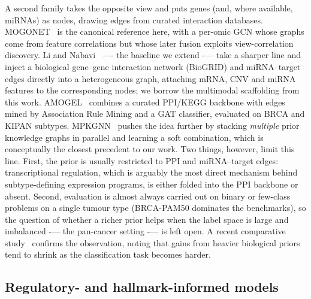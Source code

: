 \documentclass[review,3p,times,11pt, ]{elsarticle} %
\begin{document}
A second family takes the opposite view and puts genes (and, where
available, miRNAs) as nodes, drawing edges from curated interaction
databases. MOGONET~\cite{wang_mogonet_2021} is the canonical reference
here, with a per-omic GCN whose graphs come from feature correlations but
whose later fusion exploits view-correlation discovery. Li and
Nabavi~\cite{li_multimodal_2024} —- the baseline we extend -— take a
sharper line and inject a biological gene--gene interaction network
(BioGRID) and miRNA--target edges directly into a heterogeneous graph,
attaching mRNA, CNV and miRNA features to the corresponding nodes; we
borrow the multimodal scaffolding from this work. AMOGEL~\cite{tan_amogel_2025}
combines a curated PPI/KEGG backbone with edges mined by Association Rule
Mining and a GAT classifier, evaluated on BRCA and KIPAN subtypes.
MPKGNN~\cite{xiao_graph_2023} pushes the idea further by stacking
\emph{multiple} prior knowledge graphs in parallel and learning a soft
combination, which is conceptually the closest precedent to our work.
Two things, however, limit this line. First, the prior is usually
restricted to PPI and miRNA--target edges: transcriptional regulation,
which is arguably the most direct mechanism behind subtype-defining
expression programs, is either folded into the PPI backbone or absent.
Second, evaluation is almost always carried out on binary or
few-class problems on a single tumour type (BRCA-PAM50 dominates the
benchmarks), so the question of whether a richer prior helps when the
label space is large and imbalanced -— the pan-cancer setting -— is left
open. A recent comparative study~\cite{alharbi_comparative_2025} confirms
the observation, noting that gains from heavier biological priors tend to
shrink as the classification task becomes harder.

\subsection{Regulatory- and hallmark-informed models}
\label{ssec:rw_regulatory}
\end{document}
